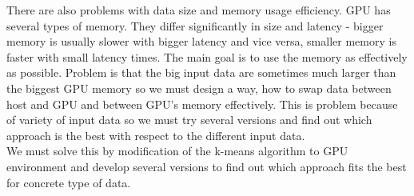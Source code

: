 There are also problems with data size and memory usage efficiency. GPU has several types of memory. They differ significantly in size and latency - bigger memory is usually slower with bigger latency and vice versa, smaller memory is faster with small latency times. The main goal is to use the memory as effectively as possible. Problem is that the big input data are sometimes much larger than the biggest GPU memory so we must design a way, how to swap data between host and GPU and between GPU's memory effectively. This is problem because of variety of input data so we must try several versions and find out which approach is the best with respect to the different input data.\\

We must solve this by modification of the k-means algorithm to GPU environment and develop several versions to find out which approach fits the best for concrete type of data.

